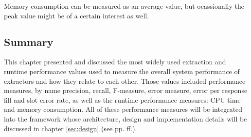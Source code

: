 Memory consumption can be measured as an average value, but ocassionally the peak value might be of a certain interest as well.


\subsection{Summary}
This chapter presented and discussed the most widely used extraction and runtime performance values used to measure the overall system performance of extractors and how they relate to each other. Those values included performance measures, by name precision, recall, F-measure, error measure, error per response fill and slot error rate, as well as the runtime performance measures: CPU time and memory consumption. All of these performance measures will be integrated into the framework whose architecture, design and implementation details will be discussed in chapter \ref{sec:design} (see pp. \pageref{sec:design}ff.).